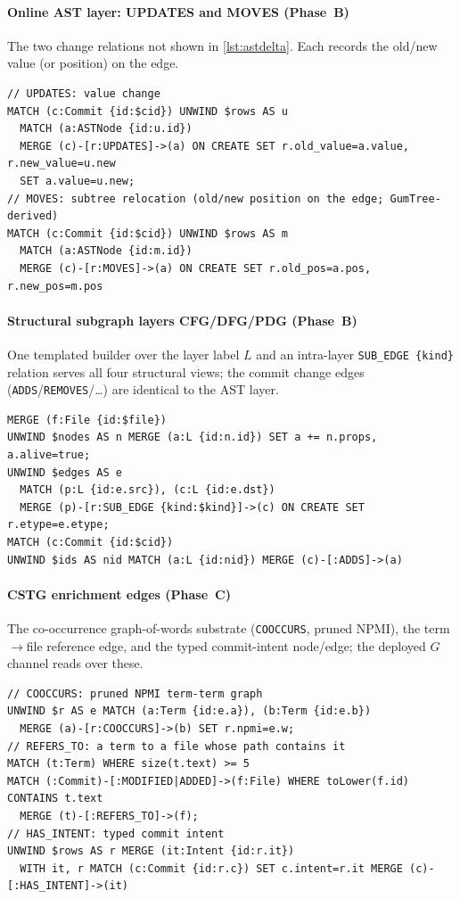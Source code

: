 \documentclass[final,5p,times,twocolumn]{elsarticle}
\theoremstyle{plain}
\begin{document}
\paragraph{Online AST layer: UPDATES and MOVES (Phase~B)}
The two change relations not shown in \autoref{lst:astdelta}. Each records the
old/new value (or position) on the edge.
\begin{lstlisting}[style=cypher]
// UPDATES: value change
MATCH (c:Commit {id:$cid}) UNWIND $rows AS u
  MATCH (a:ASTNode {id:u.id})
  MERGE (c)-[r:UPDATES]->(a) ON CREATE SET r.old_value=a.value, r.new_value=u.new
  SET a.value=u.new;
// MOVES: subtree relocation (old/new position on the edge; GumTree-derived)
MATCH (c:Commit {id:$cid}) UNWIND $rows AS m
  MATCH (a:ASTNode {id:m.id})
  MERGE (c)-[r:MOVES]->(a) ON CREATE SET r.old_pos=a.pos, r.new_pos=m.pos
\end{lstlisting}

\paragraph{Structural subgraph layers CFG/DFG/PDG (Phase~B)}
One templated builder over the layer label $L$ and an intra-layer
\texttt{SUB\_EDGE \{kind\}} relation serves all four structural views; the commit change
edges (\texttt{ADDS}/\texttt{REMOVES}/\ldots) are identical to the AST layer.
\begin{lstlisting}[style=cypher]
MERGE (f:File {id:$file})
UNWIND $nodes AS n MERGE (a:L {id:n.id}) SET a += n.props, a.alive=true;
UNWIND $edges AS e
  MATCH (p:L {id:e.src}), (c:L {id:e.dst})
  MERGE (p)-[r:SUB_EDGE {kind:$kind}]->(c) ON CREATE SET r.etype=e.etype;
MATCH (c:Commit {id:$cid})
UNWIND $ids AS nid MATCH (a:L {id:nid}) MERGE (c)-[:ADDS]->(a)
\end{lstlisting}

\paragraph{CSTG enrichment edges (Phase~C)}
The co-occurrence graph-of-words substrate (\texttt{COOCCURS}, pruned NPMI), the
term$\to$file reference edge, and the typed commit-intent node/edge; the deployed $G$
channel reads over these.
\begin{lstlisting}[style=cypher]
// COOCCURS: pruned NPMI term-term graph
UNWIND $r AS e MATCH (a:Term {id:e.a}), (b:Term {id:e.b})
  MERGE (a)-[r:COOCCURS]->(b) SET r.npmi=e.w;
// REFERS_TO: a term to a file whose path contains it
MATCH (t:Term) WHERE size(t.text) >= 5
MATCH (:Commit)-[:MODIFIED|ADDED]->(f:File) WHERE toLower(f.id) CONTAINS t.text
  MERGE (t)-[:REFERS_TO]->(f);
// HAS_INTENT: typed commit intent
UNWIND $rows AS r MERGE (it:Intent {id:r.it})
  WITH it, r MATCH (c:Commit {id:r.c}) SET c.intent=r.it MERGE (c)-[:HAS_INTENT]->(it)
\end{lstlisting}
\end{document}
